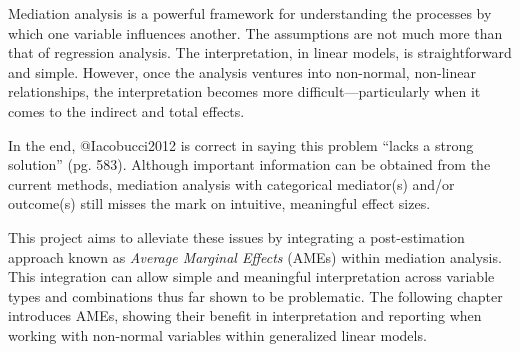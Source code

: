 \documentclass[]{article}
\begin{document}
Mediation analysis is a powerful framework for understanding the
processes by which one variable influences another. The assumptions are
not much more than that of regression analysis. The interpretation, in
linear models, is straightforward and simple. However, once the analysis
ventures into non-normal, non-linear relationships, the interpretation
becomes more difficult---particularly when it comes to the indirect and
total effects.\medskip

In the end, @Iacobucci2012 is correct in saying this problem ``lacks a
strong solution'' (pg. 583). Although important information can be
obtained from the current methods, mediation analysis with categorical
mediator(s) and/or outcome(s) still misses the mark on intuitive,
meaningful effect sizes.\medskip

This project aims to alleviate these issues by integrating a
post-estimation approach known as \emph{Average Marginal Effects} (AMEs)
within mediation analysis. This integration can allow simple and
meaningful interpretation across variable types and combinations thus
far shown to be problematic. The following chapter introduces AMEs,
showing their benefit in interpretation and reporting when working with
non-normal variables within generalized linear models.
\end{document}
